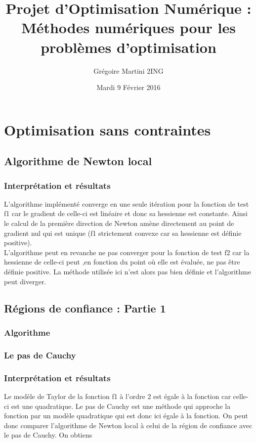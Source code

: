 \documentclass[a4paper,12pt]{article}
\title{Projet d'Optimisation Numérique : \\ \smallskip \Large Méthodes numériques pour les problèmes d'optimisation \\ \bigskip}
\author{Grégoire Martini 2ING}
\date{Mardi 9 Février 2016}
\begin{document}
\maketitle
\tableofcontents
\newpage

\section{Optimisation sans contraintes}

\subsection{Algorithme de Newton local}

\subsubsection{Interprétation et résultats}
L'algorithme implémenté converge en une seule itération pour la fonction de test f1 car le gradient de celle-ci est linéaire et donc sa hessienne est constante. Ainsi le calcul de la première direction de Newton amène directement au point de gradient nul qui est unique (f1 strictement convexe car sa hessienne est définie positive).\\

L'algorithme peut en revanche ne pas converger pour la fonction de test f2 car la hessienne de celle-ci peut ,en fonction du point où elle est évaluée, ne pas être définie positive. La méthode utilisée ici n'est alors pas bien définie et l'algorithme peut diverger.\\

\newpage
\subsection{Régions de confiance : Partie 1}
\subsubsection{Algorithme}
\subsubsection{Le pas de Cauchy}

\subsubsection{Interprétation et résultats}

Le modèle de Taylor de la fonction f1 à l'ordre 2 est égale à la fonction car celle-ci est une quadratique. Le pas de Cauchy est une méthode qui approche la fonction par un modèle quadratique qui est donc ici égale à la fonction. On peut donc comparer l'algorithme de Newton local à celui de la région de confiance avec le pas de Cauchy. On obtiens\\
\end{document}
